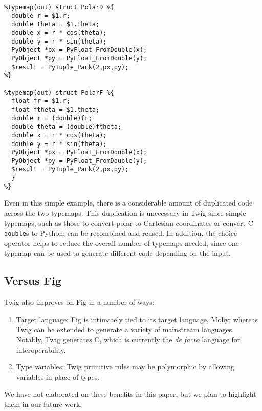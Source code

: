 \begin{verbatim}
%typemap(out) struct PolarD %{
  double r = $1.r;
  double theta = $1.theta;
  double x = r * cos(theta);
  double y = r * sin(theta);
  PyObject *px = PyFloat_FromDouble(x);
  PyObject *py = PyFloat_FromDouble(y);
  $result = PyTuple_Pack(2,px,py);
%}

%typemap(out) struct PolarF %{
  float fr = $1.r;
  float ftheta = $1.theta;
  double r = (double)fr;
  double theta = (double)ftheta;
  double x = r * cos(theta);
  double y = r * sin(theta);
  PyObject *px = PyFloat_FromDouble(x);
  PyObject *py = PyFloat_FromDouble(y);
  $result = PyTuple_Pack(2,px,py);
  }
%}
\end{verbatim}

Even in this simple example, there is a considerable amount of duplicated code across the two typemaps. This duplication is unecessary in Twig since simple typemaps, such as those to convert polar to Cartesian coordinates or convert C \texttt{double}s to Python, can be recombined and reused. In addition, the choice operator helps to reduce the overall number of typemaps needed, since one typemap can be used to generate different code depending on the input.

\subsection{Versus Fig}

Twig also improves on Fig in a number of ways:

\begin{enumerate}

\item Target language: Fig is intimately tied to its target language, Moby; whereas Twig can be extended to generate a variety of mainstream languages. Notably, Twig generates C, which is currently the \emph{de facto} language for interoperability.

\item Type variables: Twig primitive rules may be polymorphic by allowing variables in place of types.

\end{enumerate}

We have not elaborated on these benefits in this paper, but we plan to highlight them in our future work.
